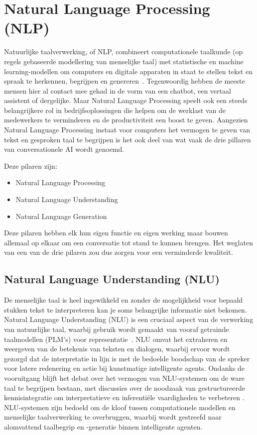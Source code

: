 \section{Natural Language Processing (NLP)}
Natuurlijke taalverwerking, of NLP, combineert computationele taalkunde (op regels gebaseerde modellering van menselijke taal) met statistische en machine learning-modellen om computers en digitale apparaten in staat te stellen tekst en spraak te herkennen, begrijpen en genereren~\autocite{IBMa}. Tegenwoordig hebben de meeste mensen hier al contact mee gehad in de vorm van een chatbot, een vertaal assistent of dergelijke. Maar Natural Language Processing speelt ook een steeds belangrijkere rol in bedrijfsoplossingen die helpen om de werklast van de medewerkers te verminderen en de productiviteit een boost te geven. Aangezien Natural Language Processing instaat voor computers het vermogen te geven van tekst en gesproken taal te begrijpen is het ook deel van wat vaak de drie pillaren van conversationele AI wordt genoemd. 

Deze pilaren zijn: 
\begin{itemize}
    \item Natural Language Processing 
    \item Natural Language Understanding
    \item Natural Language Generation
\end{itemize}
Deze pilaren hebben elk hun eigen functie en eigen werking maar bouwen allemaal op elkaar om een conversatie tot stand te kunnen brengen. Het weglaten van een van de drie pilaren zou dus zorgen voor een verminderde kwaliteit. 

\subsection{Natural Language Understanding (NLU)}
De menselijke taal is heel ingewikkeld en zonder de mogelijkheid voor bepaald stukken tekst te interpreteren kan je soms belangrijke informatie niet bekomen. Natural Language Understanding (NLU) is een cruciaal aspect van de verwerking van natuurlijke taal, waarbij gebruik wordt gemaakt van vooraf getrainde taalmodellen (PLM's) voor representatie~\autocite{LvxiaoweiXu2023}. NLU omvat het extraheren en weergeven van de betekenis van teksten en dialogen, waarbij ervoor wordt gezorgd dat de interpretatie in lijn is met de bedoelde boodschap van de spreker voor latere redenering en actie bij kunstmatige intelligente agents. Ondanks de vooruitgang blijft het debat over het vermogen van NLU-systemen om de ware taal te begrijpen bestaan, met discussies over de noodzaak van gestructureerde kennisintegratie om interpretatieve en inferentiële vaardigheden te verbeteren . NLU-systemen zijn bedoeld om de kloof tussen computationele modellen en menselijke taalverwerking te overbruggen, waarbij wordt gestreefd naar alomvattend taalbegrip en -generatie binnen intelligente agenten.


